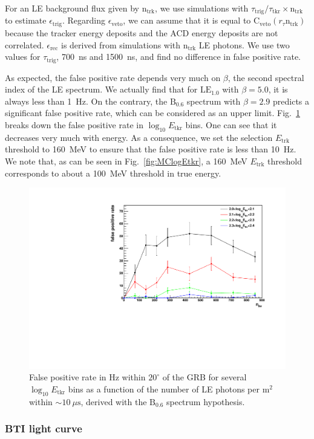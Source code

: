 \documentclass[preprint]{aastex631}
\begin{document}
For an LE background flux given by $\mathrm{n}_\mathrm{trk}$, we use simulations with $\tau_\mathrm{trig}/\tau_\mathrm{tkr} \times \mathrm{n}_\mathrm{trk}$ to estimate $\epsilon_\mathrm{trig}$. Regarding $\epsilon_\mathrm{veto}$, we can assume that it is equal to $\mathrm{C}_\mathrm{veto}(r_\tau \mathrm{n}_\mathrm{trk})$ because the tracker energy deposits and the ACD energy deposits are not correlated. $\epsilon_\mathrm{rec}$ is derived from simulations with $\mathrm{n}_\mathrm{trk}$ LE photons. We use two values for $\tau_\mathrm{trig}$, 700~ns and 1500~ns, and find no difference in false positive rate.

As expected, the false positive rate depends very much on $\beta$, the second spectral index of the LE spectrum. We actually find that for $\mathrm{LE}_{1.0}$ with $\beta=5.0$, it is always less than 1~Hz. On the contrary, the $\mathrm{B}_{0.6}$ spectrum with $\beta=2.9$ predicts a significant false positive rate, which can be considered as an upper limit. Fig.~\ref{fig:FalsePositeRate} breaks down the false positive rate in $\log_{10}E_\mathrm{tkr}$ bins. One can see that it decreases very much with energy. As a consequence, we set the selection $E_\mathrm{trk}$ threshold to 160~MeV to ensure that the false positive rate is less than 10~Hz. We note that, as can be seen in Fig.~\ref{fig:MClogEtkr}, a 160~MeV $E_\mathrm{trk}$ threshold corresponds to about a 100~MeV threshold in true energy.

\begin{figure}[t]
    \centering
    \includegraphics[width=0.6\linewidth]{paper_showFalsePositiveRate.pdf}
    \caption{False positive rate in Hz within $20^\circ$ of the GRB for several $\log_{10}E_\mathrm{tkr}$ bins as a function of the number of LE photons per $\mathrm{m}^2$ within $\sim 10~\mu\mathrm{s}$, derived with the $\mathrm{B}_{0.6}$ spectrum hypothesis.}
    \label{fig:FalsePositeRate}
\end{figure}

\subsubsection{BTI light curve}
\label{sec:BTIlightcurve}
\end{document}
